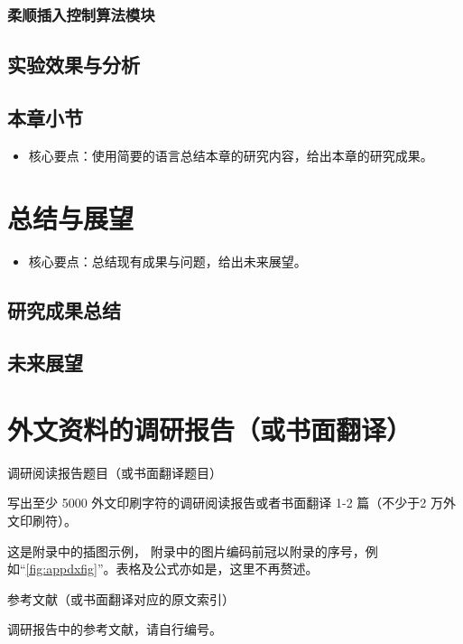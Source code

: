 \documentclass{Diploma}
\begin{document}
\subsection{柔顺插入控制算法模块}
\section{实验效果与分析}
\section{本章小节}
\begin{itemize}
  \item 核心要点：使用简要的语言总结本章的研究内容，给出本章的研究成果。
\end{itemize}
\chapter{总结与展望}
\begin{itemize}
  \item 核心要点：总结现有成果与问题，给出未来展望。
\end{itemize}
\section{研究成果总结}
\section{未来展望}


\StartAppendix%
\chapter{外文资料的调研报告（或书面翻译）}
\begin{center}
调研阅读报告题目（或书面翻译题目）
\end{center}

写出至少 5000 外文印刷字符的调研阅读报告或者书面翻译 1-2 篇（不少于2 万外文印刷符）。

这是附录中的插图示例，
%
附录中的图片编码前冠以附录的序号，例如“\ref{fig:appdxfig}”。表格及公式亦如是，这里不再赘述。

\begin{center}
参考文献（或书面翻译对应的原文索引）
\end{center}
\begin{reflist}
  \item 调研报告中的参考文献，请自行编号。
\end{reflist}
\end{document}
